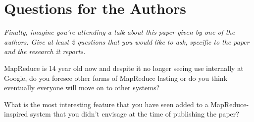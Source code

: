 \documentclass[11pt]{article}
\begin{document}
\section*{Questions for the Authors}

\textsl{Finally, imagine you're attending a talk about this paper given by one
of the authors. Give at least 2 questions that you would like to ask, specific
to the paper and the research it reports.}

MapReduce is 14 year old now and despite it no longer seeing use internally at
Google, do you foresee other forms of MapReduce lasting or do you think
eventually everyone will move on to other systems?

What is the most interesting feature that you have seen added to a
MapReduce-inspired system that you didn't envisage at the time of publishing
the paper?




\end{document}
